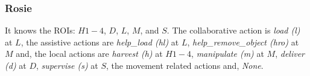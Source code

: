 \subsubsection{Rosie}
It knows the ROIs: $H1-4$, $D$, $L$, $M$, and $S$. The collaborative action is \textit{load (l)} at $L$, the assistive actions are \textit{help\_load (hl)} at $L$, \textit{help\_remove\_object (hro)} at $M$ and, the local actions are \textit{harvest (h)} at $H1-4$, \textit{manipulate (m)} at $M$, \textit{deliver (d)} at $D$, \textit{supervise (s)} at $S$, the movement related actions and, \textit{None}.
\begin{comment}
   \begin{table}[ht!]
    \centering
    \begin{tabular}{c||c|c}
        \textbf{Action} &  \textbf{Type} & \textbf{Cond}\\
        \hline\hline
        \textit{load (l)} &  collaborative & $L$\\
        \hline
        \textit{help\_load (hl)} &  assistive & $L$\\
        \hline
        \textit{help\_remove\_object (hro)} &  assistive & $M$\\
        \hline
        \textit{harverst (h)} &  local & $H1-4$\\
        \hline
        \textit{manipulate (m)} &  local & $M$\\
        \hline
        \textit{deliver (d)} &  local & $D$\\
        \hline
        \textit{supervise (s)} &  local & $S$\\
        \hline
        \textit{None} &  local &  \\
        \hline\hline
    \end{tabular}
    \caption{Action model for the Rosies}
    \label{tab:act_rosie}
\end{table} 
\end{comment}
